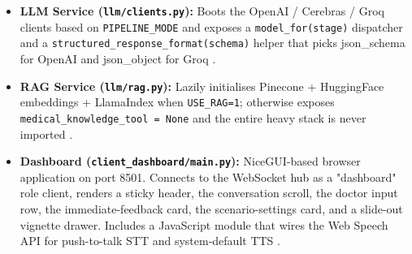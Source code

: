 \documentclass{article}
\begin{document}
\begin{itemize}
    \item \textbf{LLM Service (\texttt{llm/clients.py}):}
    Boots the OpenAI / Cerebras / Groq clients based on \texttt{PIPELINE\_MODE} and exposes a \texttt{model\_for(stage)} dispatcher and a \texttt{structured\_response\_format(schema)} helper that picks json\_schema for OpenAI and json\_object for Groq \cite{Zhao2023ASO}.

    \item \textbf{RAG Service (\texttt{llm/rag.py}):}
    Lazily initialises Pinecone + HuggingFace embeddings + LlamaIndex when \texttt{USE\_RAG=1}; otherwise exposes \texttt{medical\_knowledge\_tool = None} and the entire heavy stack is never imported \cite{Monir2024VectorSearchED}.

    \item \textbf{Dashboard (\texttt{client\_dashboard/main.py}):}
    NiceGUI-based browser application on port 8501. Connects to the WebSocket hub as a "dashboard" role client, renders a sticky header, the conversation scroll, the doctor input row, the immediate-feedback card, the scenario-settings card, and a slide-out vignette drawer. Includes a JavaScript module that wires the Web Speech API for push-to-talk STT and system-default TTS \cite{Portovaras2024CurrentTA}.
\end{itemize}
\end{document}
